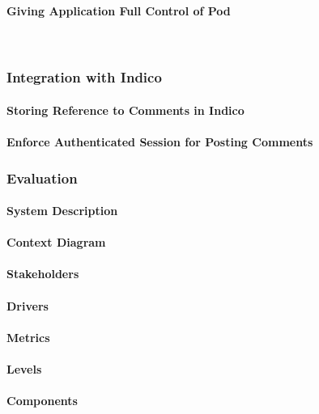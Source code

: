 \paragraph{Giving Application Full Control of Pod}\mbox{}\\

\subsubsection{Integration with Indico}

\paragraph{Storing Reference to Comments in Indico}

\paragraph{Enforce Authenticated Session for Posting Comments}


\subsubsection{Evaluation}

\paragraph{System Description}
\paragraph{Context Diagram}
\paragraph{Stakeholders}
\paragraph{Drivers}
\paragraph{Metrics}
\paragraph{Levels}
\paragraph{Components}

